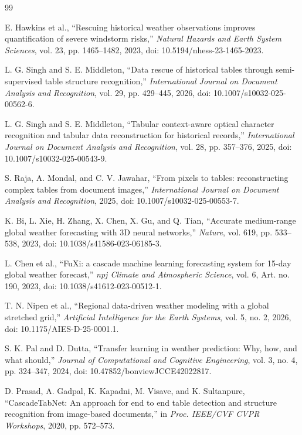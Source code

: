 \begin{thebibliography}{99}

 E. Hawkins et al., ``Rescuing historical weather observations improves quantification of severe windstorm risks,'' \textit{Natural Hazards and Earth System Sciences}, vol. 23, pp. 1465--1482, 2023, doi: 10.5194/nhess-23-1465-2023.

 L. G. Singh and S. E. Middleton, ``Data rescue of historical tables through semi-supervised table structure recognition,'' \textit{International Journal on Document Analysis and Recognition}, vol. 29, pp. 429--445, 2026, doi: 10.1007/s10032-025-00562-6.

 L. G. Singh and S. E. Middleton, ``Tabular context-aware optical character recognition and tabular data reconstruction for historical records,'' \textit{International Journal on Document Analysis and Recognition}, vol. 28, pp. 357--376, 2025, doi: 10.1007/s10032-025-00543-9.

 S. Raja, A. Mondal, and C. V. Jawahar, ``From pixels to tables: reconstructing complex tables from document images,'' \textit{International Journal on Document Analysis and Recognition}, 2025, doi: 10.1007/s10032-025-00553-7.

 K. Bi, L. Xie, H. Zhang, X. Chen, X. Gu, and Q. Tian, ``Accurate medium-range global weather forecasting with 3D neural networks,'' \textit{Nature}, vol. 619, pp. 533--538, 2023, doi: 10.1038/s41586-023-06185-3.

 L. Chen et al., ``FuXi: a cascade machine learning forecasting system for 15-day global weather forecast,'' \textit{npj Climate and Atmospheric Science}, vol. 6, Art. no. 190, 2023, doi: 10.1038/s41612-023-00512-1.

 T. N. Nipen et al., ``Regional data-driven weather modeling with a global stretched grid,'' \textit{Artificial Intelligence for the Earth Systems}, vol. 5, no. 2, 2026, doi: 10.1175/AIES-D-25-0001.1.

 S. K. Pal and D. Dutta, ``Transfer learning in weather prediction: Why, how, and what should,'' \textit{Journal of Computational and Cognitive Engineering}, vol. 3, no. 4, pp. 324--347, 2024, doi: 10.47852/bonviewJCCE42022817.

 D. Prasad, A. Gadpal, K. Kapadni, M. Visave, and K. Sultanpure, ``CascadeTabNet: An approach for end to end table detection and structure recognition from image-based documents,'' in \textit{Proc. IEEE/CVF CVPR Workshops}, 2020, pp. 572--573.


\end{thebibliography}
